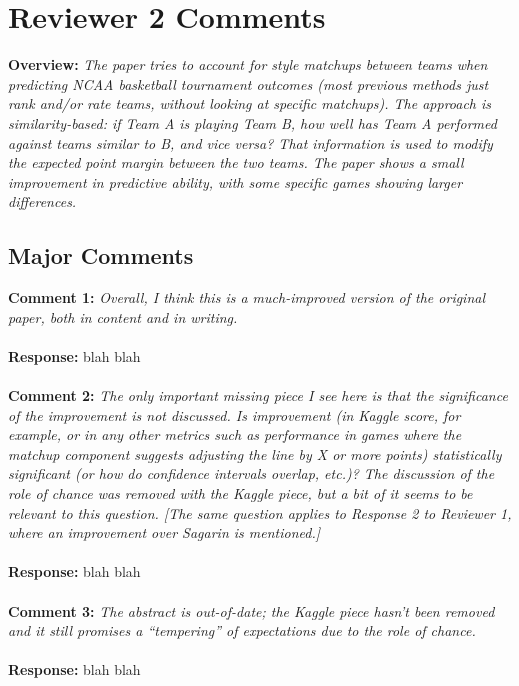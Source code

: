 \documentclass[11pt]{article} %
\begin{document}
\section*{Reviewer 2 Comments}
{\bf Overview:} \emph{The paper tries to account for style matchups between teams when predicting NCAA basketball tournament outcomes (most previous methods just rank and/or rate teams, without looking at specific matchups). The approach is similarity-based: if Team A is playing Team B, how well has Team A performed against teams similar to B, and vice versa? That information is used to modify the expected point margin between the two teams. The paper shows a small improvement in predictive ability, with some specific games showing larger differences.}
\subsection*{Major Comments}
{\bf Comment 1:} \emph{Overall, I think this is a much-improved version of the original paper, both in content and in writing.}\\
\\
{\bf Response:} blah blah\\
\\
{\bf Comment 2:} \emph{The only important missing piece I see here is that the significance of the improvement is not discussed. Is improvement (in Kaggle score, for example, or in any other metrics such as performance in games where the matchup component suggests adjusting the line by X or more points) statistically significant (or how do confidence intervals overlap, etc.)? The discussion of the role of chance was removed with the Kaggle piece, but a bit of it seems to be relevant to this question. [The same question applies to Response 2 to Reviewer 1, where an improvement over Sagarin is mentioned.]} \\
\\
{\bf Response:} blah blah\\
\\
{\bf Comment 3:} \emph{The abstract is out-of-date; the Kaggle piece hasn't been removed and it still promises a ``tempering'' of expectations due to the role of chance.}\\
\\
{\bf Response:} blah blah
\end{document}
